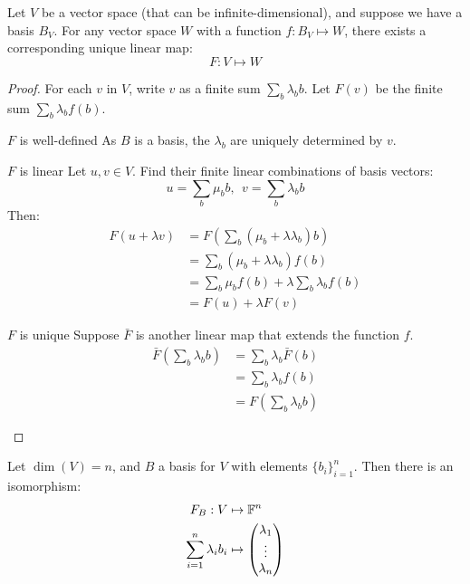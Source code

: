 \documentclass[../Main.tex]{subfiles}
\begin{document}
\begin{proposition}
    Let $V$ be a vector space (that can be infinite-dimensional), and suppose we have a basis $B_V$. For any vector space $W$ with a function $f : B_V \mapsto W$, there exists a corresponding unique linear map:
    \begin{equation*}
        F : V \mapsto W
    \end{equation*}
    \label{propLinMapOfBasis}
\end{proposition}
\begin{proof}
    For each $v$ in $V$, write $v$ as a finite sum $\sum_{b} \lambda_b b$. Let $F(v)$ be the finite sum $\sum_b \lambda_b f(b)$.

    \begin{subproof}{$F$ is well-defined}
        As $B$ is a basis, the $\lambda_b$ are uniquely determined by $v$.
    \end{subproof}
    \begin{subproof}{$F$ is linear}
        Let $u, v \in V$. Find their finite linear combinations of basis vectors:
        \begin{equation*}
            u = \sum_b \mu_b b,~~v = \sum_b \lambda_b b
        \end{equation*}
        Then:
        \begin{align*}
            F(u + \lambda v) &= F\left(\sum_b (\mu_b + \lambda\lambda_b)b\right) \\
            &= \sum_b (\mu_b + \lambda \lambda_b) f(b) \\
            &= \sum_b \mu_b f(b) + \lambda\sum_b\lambda_b f(b) \\
            &= F(u) + \lambda F(v)
        \end{align*}
    \end{subproof}
    \begin{subproof}{$F$ is unique}
        Suppose $\bar{F}$ is another linear map that extends the function $f$.
        \begin{align*}
            \bar{F} \left(\sum_b \lambda_b b\right) &= \sum_b\lambda_b \bar{F}(b) \\
            &= \sum_b \lambda_b f(b) \\
            &= F\left(\sum_b \lambda_b b\right)
        \end{align*}
    \end{subproof}
\end{proof}
\begin{corollary}
    Let $\dim(V) = n$, and $B$ a basis for $V$ with elements $\{b_i\}_{i=1}^n$. Then there is an isomorphism:
    \begin{align*}
        F_B : V &\mapsto \mathbb{F}^n\\
        \sum_{i=1}^n \lambda_i b_i &\mapsto \begin{pmatrix} \lambda_1 \\ \vdots \\ \lambda_n \end{pmatrix}
    \end{align*}
    \label{corUniqueIsom}
\end{corollary}
\end{document}

